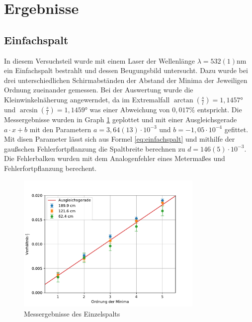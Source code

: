 \documentclass[11pt, a4paper]{article}
\begin{document}
    \section{Ergebnisse}
    \subsection{Einfachspalt}
    In diesem Versuchsteil wurde mit einem Laser der Wellenlänge $\lambda = 532(1)\si{\nano\meter}$ ein Einfachspalt bestrahlt und dessen Beugungsbild untersucht.
    Dazu wurde bei drei unterschiedlichen Schirmabständen der Abstand der Minima der Jeweiligen Ordnung zueinander gemessen. Bei der Auswertung wurde die Kleinwinkelnäherung angewerndet, da im Extremalfall $\arctan(\frac{s}{l}) = 1,1457°$ und $\arcsin(\frac{s}{l}) = 1,1459°$
    was einer Abweichung von $0,017\%$ entspricht. Die Messergebnisse wurden in Graph \ref{fig:einzelspalt} geplottet und mit einer Ausgleichsgerade $a \cdot x + b$ mit den Parametern $a = 3,64(13) \cdot 10^{-3}$ und $b= -1,05 \cdot 10^{-4}$ gefittet.
    Mit disen Parameter lässt sich aus Formel \ref{eq:einfachspalt} und mithilfe der gaußschen Fehlerfortpflanzung die Spaltbreite berechnen zu $d= 146(5) \cdot 10^{-3}$. Die Fehlerbalken wurden mit dem Analogenfehler eines Metermaßes und Fehlerfortpflanzung berechent.
    


    \begin{figure}
        \centering
        \includegraphics[width=0.8\textwidth]{./plots/einzelspalt.pdf}
        \caption{Messergebnisse des Einzelspalts}
        \label{fig:einzelspalt}
    \end{figure}
\end{document}
